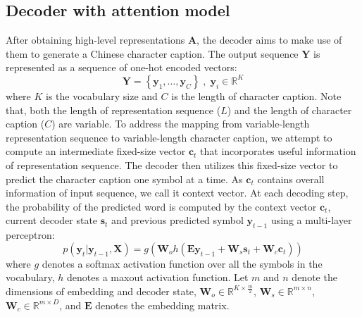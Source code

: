 \documentclass[a4paper,conference]{IEEEtran}
\begin{document}
\subsection{Decoder with attention model}
\label{sec:Decoder with attention model}
After obtaining high-level representations ${\mathbf{A}}$, the decoder aims to make use of them to generate a Chinese character caption. The output sequence ${\mathbf{Y}}$ is represented as a sequence of one-hot encoded vectors:
\begin{equation}\label{eq:caption Y}
 \mathbf{Y} = \left\{ { \mathbf{y}_1, \ldots ,\mathbf{y}_C} \right\}\;,\;{{\mathbf{y}}_i} \in {\mathbb{R}^K}
\end{equation}
where $K$ is the vocabulary size and $C$ is the length of character caption. Note that, both the length of representation sequence (${L}$) and the length of character caption (${C}$) are variable. To address the mapping from variable-length representation sequence to variable-length character caption, we attempt to compute an intermediate fixed-size vector ${\mathbf{c}_t}$ that incorporates useful information of representation sequence. The decoder then utilizes this fixed-size vector to predict the character caption one symbol at a time. As ${\mathbf{c}_t}$ contains overall information of input sequence, we call it context vector. At each decoding step, the probability of the predicted word is computed by the context vector ${\mathbf{c}_t}$, current decoder state ${\mathbf{s}_t}$ and previous predicted symbol ${\mathbf{y}_{t-1}}$ using a multi-layer perceptron:
\begin{equation}\label{eq:compute Y}
  p({{\mathbf{y}}_t}|{{\mathbf{y}}_{t - 1}},{\mathbf{X}}) = g \left ({{\mathbf{W}}_o}h({\mathbf{E}}{{\mathbf{y}}_{t - 1}} + {{\mathbf{W}}_s}{{\mathbf{s}}_t} + {{\mathbf{W}}_c}{{\mathbf{c}}_t})\right )
\end{equation}
where $g$ denotes a softmax activation function over all the symbols in the vocabulary, $h$ denotes a maxout activation function. Let $m$ and $n$ denote the dimensions of embedding and decoder state, ${{\mathbf{W}}_o} \in {\mathbb{R}^{K \times \frac{m}{2}}}$, ${{\mathbf{W}}_s} \in {\mathbb{R}^{m \times n}}$, ${{\mathbf{W}}_c} \in {\mathbb{R}^{m \times D}}$, and ${\mathbf{E}}$ denotes the embedding matrix.
\end{document}
